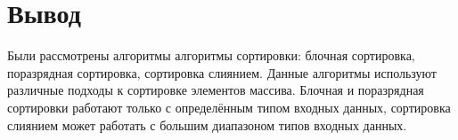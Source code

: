 \section*{Вывод}

Были рассмотрены алгоритмы алгоритмы сортировки: блочная сортировка, поразрядная сортировка, сортировка слиянием. 
Данные алгоритмы используют различные подходы к сортировке элементов массива. 
Блочная и поразрядная сортировки работают только с определённым типом входных данных, сортировка слиянием может работать с большим диапазоном типов входных данных.

\pagebreak

